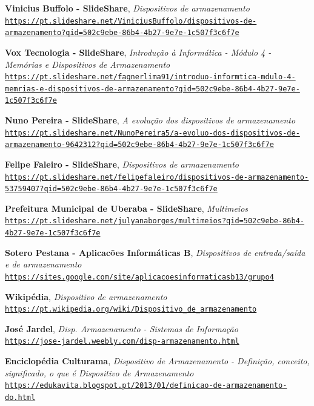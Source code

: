 \documentclass[a4paper]{report}
\begin{document}
\begin{thebibliography}{9}

\textbf{Vinicius Buffolo - SlideShare},
\textit{Dispositivos de armazenamento} 
\\\texttt{\url{https://pt.slideshare.net/ViniciusBuffolo/dispositivos-de-armazenamento?qid=502c9ebe-86b4-4b27-9e7e-1c507f3c6f7e}}
 
\textbf{Vox Tecnologia - SlideShare},
\textit{Introdução à Informática - Módulo 4 - Memórias e Dispositivos de Armazenamento}
\\\texttt{\url{https://pt.slideshare.net/fagnerlima91/introduo-informtica-mdulo-4-memrias-e-dispositivos-de-armazenamento?qid=502c9ebe-86b4-4b27-9e7e-1c507f3c6f7e}}
 
\textbf{Nuno Pereira - SlideShare},
\textit{A evolução dos dispositivos de armazenamento}
\\\texttt{\url{https://pt.slideshare.net/NunoPereira5/a-evoluo-dos-dispositivos-de-armazenamento-9642312?qid=502c9ebe-86b4-4b27-9e7e-1c507f3c6f7e}}

\textbf{Felipe Faleiro - SlideShare},
\textit{Dispositivos de armazenamento}
\\\texttt{\url{https://pt.slideshare.net/felipefaleiro/dispositivos-de-armazenamento-53759407?qid=502c9ebe-86b4-4b27-9e7e-1c507f3c6f7e}}

\textbf{Prefeitura Municipal de Uberaba - SlideShare},
\textit{Multimeios}
\\\texttt{\url{https://pt.slideshare.net/julyanaborges/multimeios?qid=502c9ebe-86b4-4b27-9e7e-1c507f3c6f7e}}

\textbf{Sotero Pestana - Aplicacões Informáticas B},
\textit{Dispositivos de entrada/saída e de armazenamento}
\\\texttt{\url{https://sites.google.com/site/aplicacoesinformaticasb13/grupo4}}

\textbf{Wikipédia},
\textit{Dispositivo de armazenamento}
\\\texttt{\url{https://pt.wikipedia.org/wiki/Dispositivo_de_armazenamento}}

\textbf{José Jardel},
\textit{Disp. Armazenamento - Sistemas de Informação}
\\\texttt{\url{https://jose-jardel.weebly.com/disp-armazenamento.html}}

\textbf{Enciclopédia Culturama},
\textit{Dispositivo de Armazenamento - Definição, conceito, significado, o que é Dispositivo de Armazenamento}
\\\texttt{\url{https://edukavita.blogspot.pt/2013/01/definicao-de-armazenamento-do.html}}


\end{thebibliography}
\end{document}
